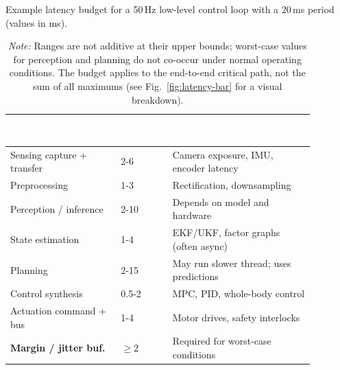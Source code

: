\documentclass[smallextended]{svjour3}
\begin{document}
\begin{table}[htbp]
  \centering
  \caption{Example latency budget for a 50\,Hz low-level control loop
    with a 20\,ms period (values in ms).}
  \label{tab:latency}
  \renewcommand{\arraystretch}{1.15}
  \begin{tabular}{@{}L{0.32\linewidth}C{0.15\linewidth}L{0.41\linewidth}@{}}
    \toprule
    \textcolor{white}{\textbf{Stage}} &
    \textcolor{white}{\textbf{Typical (ms)}} &
    \textcolor{white}{\textbf{Notes}} \\
    \midrule
    Sensing capture + transfer   & 2-6   & Camera exposure, IMU, encoder latency \\
    Preprocessing                & 1-3   & Rectification, downsampling \\
    Perception / inference       & 2-10  & Depends on model and hardware \\
    State estimation             & 1-4   & EKF/UKF, factor graphs (often async) \\
    Planning                     & 2-15  & May run slower thread; uses predictions \\
    Control synthesis            & 0.5-2 & MPC, PID, whole-body control \\
    Actuation command + bus      & 1-4   & Motor drives, safety interlocks \\
    \textbf{Margin / jitter buf.}& $\geq2$& Required for worst-case conditions \\
    \bottomrule
  \end{tabular}
  \renewcommand{\arraystretch}{1}
  \caption*{\footnotesize\textit{Note:} Ranges are not additive at   their upper bounds; worst-case values for perception and planning do not co-occur under normal operating conditions. The budget applies to the end-to-end critical path, not the sum of all maximums (see Fig.~\ref{fig:latency-bar} for a visual breakdown).}
  \end{table}
\end{document}
